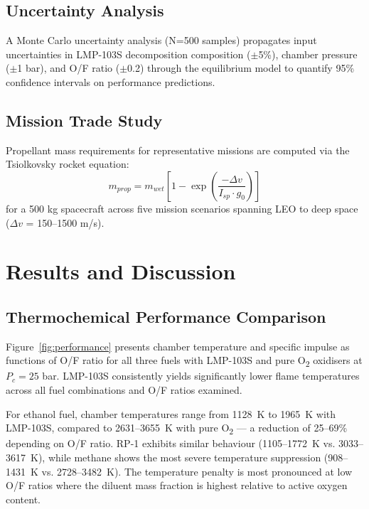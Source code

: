 \documentclass[review]{elsarticle}
\begin{document}
\subsection{Uncertainty Analysis}

A Monte Carlo uncertainty analysis (N=500 samples) 
propagates input uncertainties in LMP-103S decomposition 
composition ($\pm$5\%), chamber pressure ($\pm$1 bar), 
and O/F ratio ($\pm$0.2) through the equilibrium model 
to quantify 95\% confidence intervals on performance 
predictions.

\subsection{Mission Trade Study}

Propellant mass requirements for representative missions 
are computed via the Tsiolkovsky rocket equation:
\begin{equation}
    m_{prop} = m_{wet}\left[1 - 
    \exp\left(\frac{-\Delta v}{I_{sp} \cdot g_0}\right)
    \right]
\end{equation}
for a 500 kg spacecraft across five mission scenarios 
spanning LEO to deep space ($\Delta v$ = 150--1500 m/s).

\section{Results and Discussion}

\subsection{Thermochemical Performance Comparison}

Figure~\ref{fig:performance} presents chamber temperature and specific 
impulse as functions of O/F ratio for all three fuels with LMP-103S 
and pure O\textsubscript{2} oxidisers at $P_c = 25$ bar. LMP-103S 
consistently yields significantly lower flame temperatures across all 
fuel combinations and O/F ratios examined.

For ethanol fuel, chamber temperatures range from 1128~K to 1965~K 
with LMP-103S, compared to 2631--3655~K with pure O\textsubscript{2} 
— a reduction of 25--69\% depending on O/F ratio. RP-1 exhibits 
similar behaviour (1105--1772~K vs. 3033--3617~K), while methane shows 
the most severe temperature suppression (908--1431~K vs. 2728--3482~K). 
The temperature penalty is most pronounced at low O/F ratios where the 
diluent mass fraction is highest relative to active oxygen content.
\end{document}
